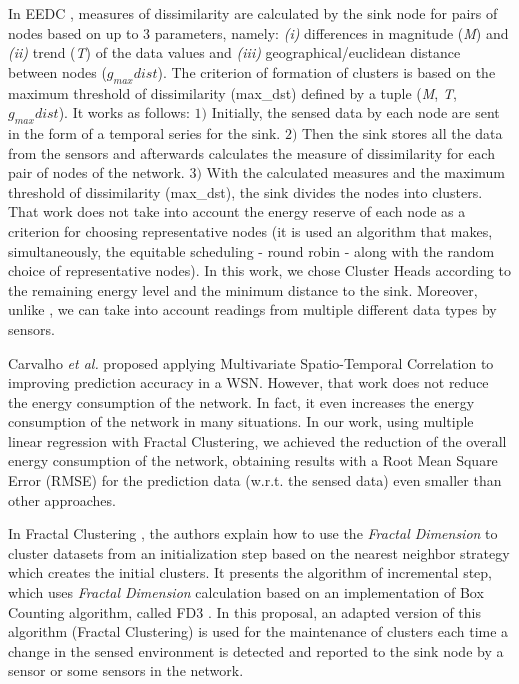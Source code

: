 \documentclass{acm_proc_article-sp}
\begin{document}
In EEDC \cite{Liu2007}, measures of dissimilarity are calculated by the sink
node for pairs of nodes based on up to $3$ parameters, namely: {\it (i)}
differences in magnitude (\textit{M}) and {\it (ii)} trend (\textit{T}) of the
data values and {\it (iii)} geographical/euclidean distance between nodes
($g_{max}dist$).
The criterion of formation of clusters is based on the maximum threshold of
dissimilarity (max\_dst) defined by a tuple (\textit{M}, \textit{T},
$g_{max}dist$). It works as follows: $1)$ Initially, the sensed data by each
node are sent in the form of a temporal series for the sink. $2)$ Then the sink
stores all the data from the sensors and afterwards calculates the measure of
dissimilarity for each pair of nodes of the network. $3)$
With the calculated measures and the maximum threshold of dissimilarity
(max\_dst), the sink divides the nodes into clusters.
That work does not take into account the energy reserve of each node as a
criterion for choosing representative nodes (it is used an algorithm that makes,
simultaneously, the equitable scheduling - round robin - along with the random
choice of representative nodes). In this work, we chose Cluster Heads according
to the remaining energy level and the minimum distance to the sink. Moreover,
unlike \cite{Liu2007}, we can take into account readings from multiple different
data types by sensors.
\vspace*{-.3cm}

Carvalho \textit{et al.} \cite{Carvalho2011} proposed applying Multivariate
Spatio-Temporal Correlation to improving prediction accuracy in a WSN. However,
that work does not reduce the energy consumption of the network. In fact, it
even increases the energy consumption of the network in many situations. In our
work, using multiple linear regression with Fractal Clustering, we achieved the
reduction of the overall energy consumption of the network, obtaining results
with a Root Mean Square Error (RMSE) for the prediction data (w.r.t. the sensed
data) even smaller than other approaches.
\vspace*{-.3cm}

In Fractal Clustering \cite{Barbara2000}, the authors explain how to use the
\textit{Fractal Dimension} to cluster datasets from an initialization step based
on the nearest neighbor strategy which creates the initial clusters. It presents
the algorithm of incremental step, which uses \textit{Fractal Dimension}
calculation based on an implementation of Box Counting algorithm, called FD3
\cite{Liebovitch1989}. In this proposal, an adapted version of this algorithm
(Fractal Clustering) is used for the maintenance of clusters each time a change
in the sensed environment is detected and reported to the sink node by a sensor
or some sensors in the network.
\end{document}
